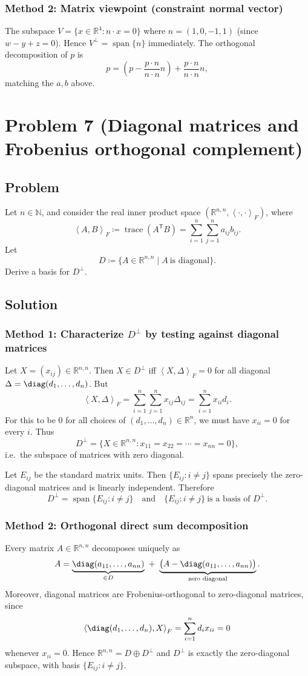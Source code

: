 \documentclass[12pt]{article}
\newcommand{\df}{\coloneqq}
\newcommand{\R}{\mathbb{R}}
\DeclareMathOperator{\Span}{span}
\DeclareMathOperator{\tr}{trace}
\newcommand{\ip}[2]{\left\langle #1,#2\right\rangle}
\begin{document}
\subsubsection{Method 2: Matrix viewpoint (constraint normal vector)}
The subspace $V=\{x\in\R^4: n\cdot x=0\}$ where $n=(1,0,-1,1)$ (since $w-y+z=0$).
Hence $V^\perp=\Span\{n\}$ immediately. The orthogonal decomposition of $p$ is
\[
p=\left(p-\frac{p\cdot n}{n\cdot n}n\right)+\frac{p\cdot n}{n\cdot n}n,
\]
matching the $a,b$ above.

\newpage
\section{Problem 7 (Diagonal matrices and Frobenius orthogonal complement)}
\subsection{Problem}
Let $n\in\mathbb{N}$, and consider the real inner product space $(\R^{n,n},\ip{\cdot}{\cdot}_F)$, where
\[
\ip{A}{B}_F\df \tr(A^{\mathsf T}B)=\sum_{i=1}^n\sum_{j=1}^n a_{ij}b_{ij}.
\]
Let
\[
D\df \{A\in\R^{n,n}\mid A\ \text{is diagonal}\}.
\]
Derive a basis for $D^\perp$.

\subsection{Solution}

\subsubsection{Method 1: Characterize $D^\perp$ by testing against diagonal matrices}
Let $X=(x_{ij})\in\R^{n,n}$. Then $X\in D^\perp$ iff $\ip{X}{\Delta}_F=0$ for all diagonal $\Delta=\diag(d_1,\dots,d_n)$.
But
\[
\ip{X}{\Delta}_F=\sum_{i=1}^n\sum_{j=1}^n x_{ij}\Delta_{ij}=\sum_{i=1}^n x_{ii}d_i.
\]
For this to be $0$ for all choices of $(d_1,\dots,d_n)\in\R^n$, we must have $x_{ii}=0$ for every $i$.
Thus
\[
D^\perp=\{X\in\R^{n,n}: x_{11}=x_{22}=\cdots=x_{nn}=0\},
\]
i.e.\ the subspace of matrices with zero diagonal.

Let $E_{ij}$ be the standard matrix units. Then $\{E_{ij}: i\neq j\}$ spans precisely the zero-diagonal matrices and is linearly independent.
Therefore
\[
\boxed{\,D^\perp=\Span\{E_{ij}: i\neq j\}\quad\text{and}\quad \{E_{ij}: i\neq j\}\ \text{is a basis of }D^\perp.\,}
\]

\subsubsection{Method 2: Orthogonal direct sum decomposition}
Every matrix $A\in\R^{n,n}$ decomposes uniquely as
\[
A=\underbrace{\diag(a_{11},\dots,a_{nn})}_{\in D}\ +\ \underbrace{\bigl(A-\diag(a_{11},\dots,a_{nn})\bigr)}_{\text{zero diagonal}}.
\]
Moreover, diagonal matrices are Frobenius-orthogonal to zero-diagonal matrices, since
\[
\ip{\diag(d_1,\dots,d_n)}{X}_F=\sum_{i=1}^n d_i x_{ii}=0
\]
whenever $x_{ii}=0$. Hence $\R^{n,n}=D\oplus D^\perp$ and $D^\perp$ is exactly the zero-diagonal subspace,
with basis $\{E_{ij}:i\neq j\}$.
\end{document}
